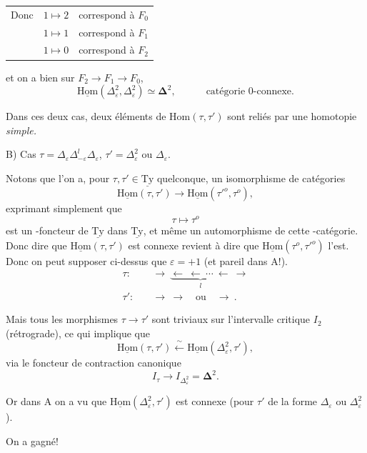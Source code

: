\documentclass[11pt]{article}
\newcommand{\printedpage}[1]{\marginpar{\footnotesize p.~#1}}
\newcommand{\msp}[1]{\marginpar{\footnotesize [#1]}}
\newcommand{\uHom}{\underline{\mathrm{Hom}}}
\newcommand{\uTy}{\underline{\mathrm{Ty}}}
\begin{document}
\printedpage{59}

\begin{tabular}{lll}
Donc & $1\longmapsto 2$ & correspond à \quad $F_0$\\[1ex]
 & $1\longmapsto 1$ & correspond à \quad $F_1$\\[1ex]
 & $1\longmapsto 0$ & correspond à \quad $F_2$
\end{tabular}

et on a bien sur $F_2\longrightarrow F_1\longrightarrow F_0$, %
\[
\uHom(\Delta^2_\varepsilon,\Delta^2_\varepsilon)\simeq\boldsymbol{\Delta}^2,\qquad\quad\text{catégorie 0-connexe.}
\]

Dans ces deux cas, deux éléments de $\mathrm{Hom}(\tau,\tau')$ sont reliés par une homotopie \textit{simple.}

\msp{page 93}

B) Cas $\tau=\Delta_\varepsilon\Delta^l_{-\varepsilon}\Delta_\varepsilon$, $\tau'=\Delta^2_\varepsilon$ ou $\Delta_\varepsilon$.

Notons que l'on a, pour $\tau,\tau'\in\uTy$ quelconque, un isomorphisme de catégories
\[
\uHom(\tau,\tau')\longrightarrow\uHom(\tau'^o,\tau^o),
\]
exprimant simplement que
\[
\tau\longmapsto\tau^o
\]
est un -foncteur de $\uTy$ dans $\uTy$, et même un automorphisme de cette -catégorie. Donc dire que $\uHom(\tau,\tau')$ est connexe revient à dire que $\uHom(\tau^o,\tau'^o)$ l'est. Donc on peut supposer ci-dessus que $\varepsilon=+1$ (et pareil dans A!).
\[
\begin{aligned}
\tau :\quad & \longrightarrow\ \underbrace{\longleftarrow\ \longleftarrow\ \cdots\ \longleftarrow}_{l}\ \longrightarrow\\
\tau' :\quad & \longrightarrow\ \longrightarrow\quad\text{ou}\quad\longrightarrow\ .
\end{aligned}
\]

Mais tous les morphismes $\tau\longrightarrow\tau'$ sont triviaux sur l'intervalle critique $I_2$ (rétrograde), ce qui implique que
\[
\uHom(\tau,\tau')\xleftarrow{\ \sim\ }\uHom(\Delta^2_\varepsilon,\tau'),
\]
via le foncteur de contraction canonique
\[
I_\tau\longrightarrow I_{\Delta^2_\varepsilon}=\boldsymbol{\Delta}^2.
\]

Or dans A on a vu que $\uHom(\Delta^2_\varepsilon,\tau')$ est connexe (pour $\tau'$ de la forme $\Delta_\varepsilon$ ou $\Delta^2_\varepsilon$).

On a gagné!

\newpage
\printedpage{60}
\end{document}
